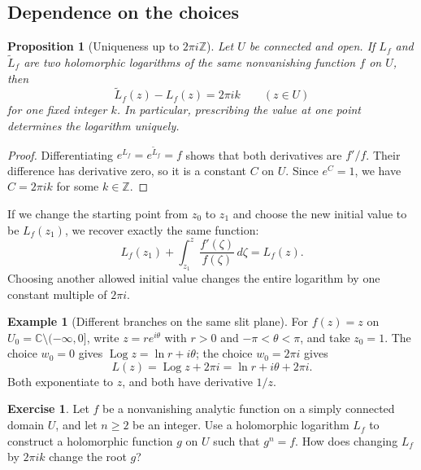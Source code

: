 \documentclass[11pt]{article}
\theoremstyle{plain}
\newtheorem{proposition}[theorem]{Proposition}
\theoremstyle{definition}
\newtheorem{example}[theorem]{Example}
\newtheorem{exercise}[theorem]{Exercise}
\theoremstyle{remark}
\numberwithin{equation}{section}
\newcommand{\C}{\mathbb{C}}
\newcommand{\Z}{\mathbb{Z}}
\DeclareMathOperator{\Log}{Log}
\begin{document}
\subsection{Dependence on the choices}
\begin{proposition}[Uniqueness up to $2\pi i\Z$]\label{prop:log-unique}
Let $U$ be connected and open. If $L_f$ and $\widetilde L_f$ are two
holomorphic logarithms of the same nonvanishing function $f$ on $U$, then
\[
 \widetilde L_f(z)-L_f(z)=2\pi i k\qquad(z\in U)
\]
for one fixed integer $k$. In particular, prescribing the value at one
point determines the logarithm uniquely.
\end{proposition}
\begin{proof}
Differentiating $e^{L_f}=e^{\widetilde L_f}=f$ shows that both derivatives
are $f'/f$. Their difference has derivative zero, so it is a constant
$C$ on $U$. Since $e^C=1$, we have $C=2\pi i k$ for some $k\in\Z$.
\end{proof}
If we change the starting point from $z_0$ to $z_1$ and choose the new
initial value to be $L_f(z_1)$, we recover exactly the same function:
\[
 L_f(z_1)+\int_{z_1}^z\frac{f'(\zeta)}{f(\zeta)}\,d\zeta=L_f(z).
\]
Choosing another allowed initial value changes the entire logarithm by
one constant multiple of $2\pi i$.

\begin{example}[Different branches on the same slit plane]
For $f(z)=z$ on $U_0=\C\setminus(-\infty,0]$, write $z=re^{i\theta}$
with $r>0$ and $-\pi<\theta<\pi$, and take $z_0=1$. The choice $w_0=0$
gives $\Log z=\ln r+i\theta$; the choice $w_0=2\pi i$ gives
\[
 L(z)=\Log z+2\pi i=\ln r+i\theta+2\pi i.
\]
Both exponentiate to $z$, and both have derivative $1/z$.
\end{example}

\begin{exercise}
Let $f$ be a nonvanishing analytic function on a simply connected domain
$U$, and let $n\geq2$ be an integer. Use a holomorphic logarithm $L_f$
to construct a holomorphic function $g$ on $U$ such that $g^n=f$.
How does changing $L_f$ by $2\pi i k$ change the root $g$?
\end{exercise}
\end{document}
